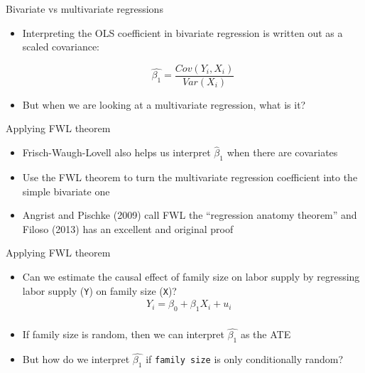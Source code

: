 \documentclass{beamer}
\begin{document}
\begin{frame}{Bivariate vs multivariate regressions}

\begin{itemize}

\item Interpreting the OLS coefficient in bivariate regression is written out as a scaled covariance:

 $$\widehat{\beta_1}=\frac{Cov(Y_i,X_i)}{Var(X_i)}$$
 
 \item But when we are looking at a multivariate regression, what is it?
 
 \end{itemize}
 
 \end{frame}
 
 \begin{frame}{Applying FWL theorem}

\begin{itemize}
\item Frisch-Waugh-Lovell also helps us interpret $\widehat{\beta}_1$ when there are covariates
 \item Use the FWL theorem to turn the multivariate regression coefficient into the simple bivariate one
\item Angrist and Pischke (2009) call FWL the ``regression anatomy theorem'' and Filoso (2013) has an excellent and original proof
\end{itemize}

\end{frame}



\begin{frame}{Applying FWL theorem}

	\begin{itemize}
	\item Can we estimate the causal effect of family size on labor supply by regressing labor supply (\texttt{Y}) on family size (\texttt{X})?
		\begin{eqnarray*}
		Y_i = \beta_0 + \beta_1 X_i + u_i&\\
		\end{eqnarray*}
	\item If family size is random, then we can interpret $\widehat{\beta_1}$ as the ATE
	\item But how do we interpret $\widehat{\beta_1}$ if \texttt{family size} is only conditionally random?  
	\end{itemize}
\end{frame}
\end{document}
